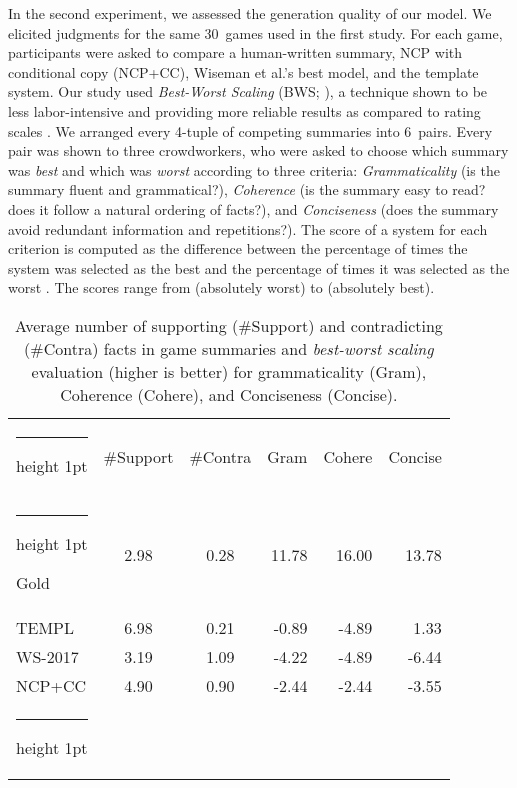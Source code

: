 \documentclass[letterpaper]{article} \usepackage{aaai19}  \usepackage{times}  \usepackage{helvet}  \usepackage{courier}  \usepackage{url}  \usepackage{graphicx}  \frenchspacing  \setlength{\pdfpagewidth}{8.5in}  \setlength{\pdfpageheight}{11in}  \graphicspath{ {images/} }
\makeatletter
\newcommand{\thickhline}{\noalign {\ifnum 0=`}\fi \hrule height 1pt
    \futurelet \reserved@a \@xhline
}
\makeatother
\begin{document}
In the second experiment, we assessed the generation quality of our
model.  We elicited judgments for the same 30~games used in the first
study. For each game, participants were asked to compare a
human-written summary, NCP with conditional copy (NCP+CC), Wiseman et
al.'s  best model, and the template
system.  
Our study used \textit{Best-Worst Scaling} (BWS;
\citeauthor{louviere2015best} \citeyear{louviere2015best}), a technique shown to be
less labor-intensive and providing more reliable results as compared to 
rating scales \cite{kiritchenko2017best}. We arranged every 4-tuple of competing
summaries into 6~pairs. Every pair was shown to three crowdworkers,
who were asked to choose which summary was {\it best} and which was {\it worst}
according to three criteria: \emph{Grammaticality}
(is the summary fluent and grammatical?), \emph{Coherence} (is the
summary easy to read? does it follow a natural ordering of facts?),
and \emph{Conciseness} (does the summary avoid redundant information
and repetitions?). The score of a system for each criterion is computed as the difference between the percentage
of times the system was selected as the best and the percentage of times it was
selected as the worst \cite{orme2009maxdiff}. The scores range from 
(absolutely worst) to  (absolutely best).

\begin{table}[t]
\small
\centering
\begin{tabular}{@{~}lccrrr@{~}}
\thickhline 
 & \#Support & \#Contra & Gram & Cohere & Concise \\
\thickhline 
Gold    & 2.98 & 0.28 & 11.78 & 16.00& 13.78 \\
TEMPL   & {6.98} & {0.21} & -0.89 &-4.89 & 1.33\\
WS-2017 & 3.19 & 1.09 & -4.22 &-4.89 &-6.44 \\
NCP+CC  & 4.90 & 0.90 & -2.44 & -2.44&-3.55\\
\thickhline 
\end{tabular} 
\caption{Average number of supporting (\#Support) and contradicting
  (\#Contra) facts
  in game summaries and   \textit{best-worst scaling}
  evaluation (higher is better) for grammaticality (Gram), Coherence (Cohere), and
  Conciseness (Concise).}
\label{tbl:human-eval}
\end{table}
\end{document}
